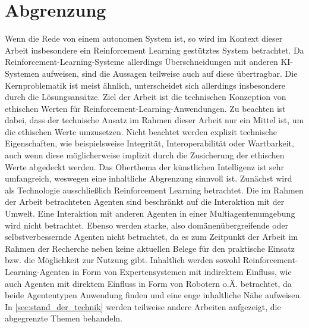 \section{Abgrenzung}\label{sec:abgrenzung}
Wenn die Rede von einem autonomen System ist, so wird im Kontext dieser Arbeit insbesondere ein Reinforcement Learning gestütztes System betrachtet.
Da Reinforcement-Learning-Systeme allerdings Überschneidungen mit anderen KI-Systemen aufweisen, sind die Aussagen teilweise auch auf diese übertragbar.
Die Kernproblematik ist meist ähnlich, unterscheidet sich allerdings insbesondere durch die Lösungsansätze.
Ziel der Arbeit ist die technischen Konzeption von ethischen Werten für Reinforcement-Learning-Anwendungen.
Zu beachten ist dabei, dass der technische Ansatz im Rahmen dieser Arbeit nur ein Mittel ist, um die ethischen Werte umzusetzen.
Nicht beachtet werden explizit technische Eigenschaften, wie beispielsweise Integrität, Interoperabilität oder Wartbarkeit, auch wenn diese möglicherweise implizit durch die Zusicherung der ethischen Werte abgedeckt werden.
\ab 
Das Oberthema der künstlichen Intelligenz ist sehr umfangreich, weswegen eine inhaltliche Abgrenzung sinnvoll ist.
Zunächst wird als Technologie ausschließlich Reinforcement Learning betrachtet. 
Die im Rahmen der Arbeit betrachteten Agenten sind beschränkt auf die Interaktion mit der Umwelt.
Eine Interaktion mit anderen Agenten in einer Multiagentenumgebung wird nicht betrachtet.
Ebenso werden starke, also domänenübergreifende oder selbstverbessernde Agenten nicht betrachtet, da es zum Zeitpunkt der Arbeit im Rahmen der Recherche neben \cite{hall2007} keine aktuellen Belege für den praktische Einsatz bzw. die Möglichkeit zur Nutzung gibt.
Inhaltlich werden sowohl Reinforcement-Learning-Agenten in Form von Expertensystemen mit indirektem Einfluss, wie auch Agenten mit direktem Einfluss in Form von Robotern o.Ä. betrachtet, da beide Agententypen Anwendung finden und eine enge inhaltliche Nähe aufweisen.
In \autoref{sec:stand_der_technik} werden teilweise andere Arbeiten aufgezeigt, die abgegrenzte Themen behandeln.